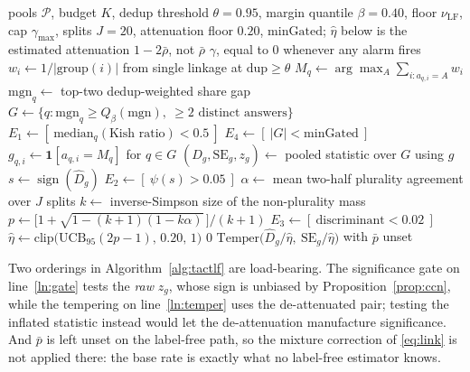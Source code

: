 \documentclass[twoside,11pt]{article}
\newcommand{\Dhat}{\widehat{D}}
\newcommand{\sign}{\operatorname{sign}}
\newcommand{\SC}{\textsc{sc}}
\newcommand{\TACT}{\textsc{tact}}
\begin{document}
\begin{algorithm}[t]
\caption{\TACT-LF: recovering the sign without labels}
\label{alg:tactlf}
\begin{algorithmic}[1]
\Require pools $\mathcal{P}$, budget $K$, dedup threshold $\theta{=}0.95$,
margin quantile $\beta{=}0.40$, floor $\nu_{\mathrm{LF}}$, cap $\gamma_{\max}$,
splits $J{=}20$, attenuation floor $0.20$, $\mathrm{minGated}$; $\hat\eta$ below is the
estimated attenuation $1-2\bar\rho$, not $\bar\rho$
\Ensure $\gamma$, equal to $0$ whenever any alarm fires
  \State $w_i\gets 1/|\text{group}(i)|$ from single linkage at $\mathrm{dup}\ge\theta$
  \State $M_q\gets\arg\max_A\sum_{i:a_{q,i}=A}w_i$ 
  \State $\mathrm{mgn}_q\gets$ top-two dedup-weighted share gap
\EndFor
\State $G\gets\{q:\mathrm{mgn}_q\ge Q_\beta(\mathrm{mgn}),\ \text{$\ge 2$ distinct answers}\}$
\State $E_1\gets[\ \mathrm{median}_q(\text{Kish ratio})<0.5\ ]$ 
\State $E_4\gets[\ |G|<\mathrm{minGated}\ ]$
\State $g_{q,i}\gets\mathbf{1}[a_{q,i}=M_q]$ for $q\in G$
\State $(\Dhat_g,\mathrm{SE}_g,z_g)\gets$ pooled statistic over $G$ using $g$
\State $s\gets\sign(\Dhat_g)$ 
\State $E_2\gets[\ \psi(s)>0.05\ ]$ 
\State $\alpha\gets$ mean two-half plurality agreement over $J$ splits
\State $k\gets$ inverse-Simpson size of the non-plurality mass
\State $p\gets\big[1+\sqrt{1-(k{+}1)(1-k\alpha)}\,\big]/(k{+}1)$
\State $E_3\gets[\ \text{discriminant}<0.02\ ]$ 
\State $\hat\eta\gets\mathrm{clip}\big(\mathrm{UCB}_{95}(2p-1),\,0.20,\,1\big)$
 \label{ln:gate}
  \State \Return $0$ \Comment{refuse; the vote stays \SC}
\EndIf
\State \Return $\mathrm{Temper}\big(\Dhat_g/\hat\eta,\ \mathrm{SE}_g/\hat\eta\big)$ with $\bar p$ unset \label{ln:temper}
\end{algorithmic}
\end{algorithm}

Two orderings in Algorithm~\ref{alg:tactlf} are load-bearing. The significance
gate on line~\ref{ln:gate} tests the \emph{raw} $z_g$, whose sign is unbiased by
Proposition~\ref{prop:ccn}, while the tempering on line~\ref{ln:temper} uses
the de-attenuated pair; testing the inflated statistic instead would let the
de-attenuation manufacture significance. And $\bar p$ is left unset on the
label-free path, so the mixture correction of \eqref{eq:link} is not applied
there: the base rate is exactly what no label-free estimator knows.
\end{document}
